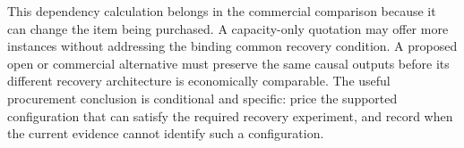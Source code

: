 This dependency calculation belongs in the commercial comparison because it
can change the item being purchased. A capacity-only quotation may offer more
instances without addressing the binding common recovery condition. A proposed
open or commercial alternative must preserve the same causal outputs before
its different recovery architecture is economically comparable. The useful
procurement conclusion is conditional and specific: price the supported
configuration that can satisfy the required recovery experiment, and record
when the current evidence cannot identify such a configuration.
